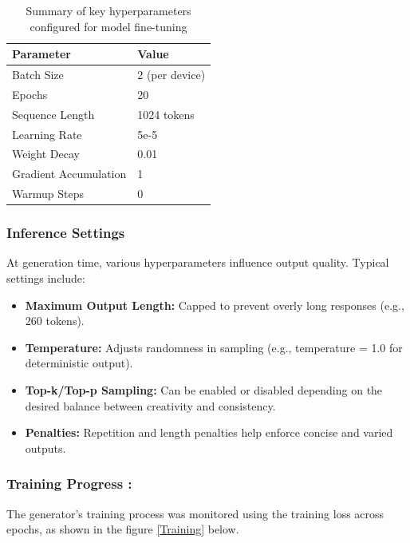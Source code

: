 \begin{table}[h]
	\centering
	
	\begin{tabular}{|l|l|}
		\hline
		\textbf{Parameter} & \textbf{Value} \\ \hline
		Batch Size & 2 (per device) \\ \hline
		Epochs & 20 \\ \hline
		Sequence Length & 1024 tokens \\ \hline
		Learning Rate & 5e-5 \\ \hline
		Weight Decay & 0.01 \\ \hline
		Gradient Accumulation & 1 \\ \hline
		Warmup Steps & 0 \\ \hline
		
	\end{tabular}
	\caption{Summary of key hyperparameters configured for model fine-tuning}
\end{table}
 

\subsubsection{Inference Settings}
At generation time, various hyperparameters influence output quality. Typical settings include:
\begin{itemize}
	\item \textbf{Maximum Output Length:} Capped to prevent overly long responses (e.g., 260 tokens).
	\item \textbf{Temperature:} Adjusts randomness in sampling (e.g., temperature = 1.0 for deterministic output).
	\item \textbf{Top-k/Top-p Sampling:} Can be enabled or disabled depending on the desired balance between creativity and consistency.
	\item \textbf{Penalties:} Repetition and length penalties help enforce concise and varied outputs.
\end{itemize}

 \subsubsection{Training Progress :}
The generator's training process was monitored using the training loss across epochs, as shown in the figure \ref{Training} below. 



